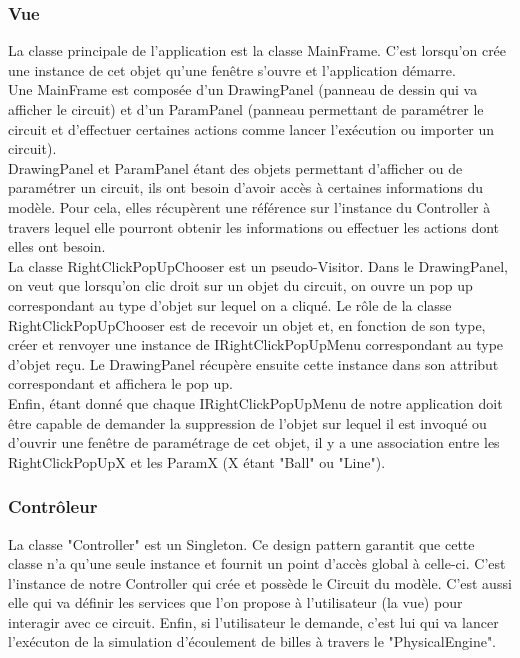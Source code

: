 \documentclass{report}
\begin{document}
\subsubsection{Vue}

La classe principale de l'application est la classe MainFrame. C'est lorsqu'on crée une instance de cet objet qu'une fenêtre s'ouvre et l'application démarre. \\

Une MainFrame est composée d'un DrawingPanel (panneau de dessin qui va afficher le circuit) et d'un ParamPanel (panneau permettant de paramétrer le circuit et d'effectuer certaines actions comme lancer l'exécution ou importer un circuit). \\

DrawingPanel et ParamPanel étant des objets permettant d'afficher ou de paramétrer un circuit, ils ont besoin d'avoir accès à certaines informations du modèle. Pour cela, elles récupèrent une référence sur l'instance du Controller à travers lequel elle pourront obtenir les informations ou effectuer les actions dont elles ont besoin. \\

La classe RightClickPopUpChooser est un pseudo-Visitor. Dans le DrawingPanel, on veut que lorsqu'on clic droit sur un objet du circuit, on ouvre un pop up correspondant au type d'objet sur lequel on a cliqué. Le rôle de la classe RightClickPopUpChooser est de recevoir un objet et, en fonction de son type, créer et renvoyer une instance de  IRightClickPopUpMenu correspondant au type d'objet reçu. Le DrawingPanel récupère ensuite cette instance dans son attribut correspondant et affichera le pop up. \\

Enfin, étant donné que chaque IRightClickPopUpMenu de notre application doit être capable de demander la suppression de l'objet sur lequel il est invoqué ou d'ouvrir une fenêtre de paramétrage de cet objet, il y a une association entre les RightClickPopUpX et les ParamX (X étant "Ball" ou "Line").

\subsubsection{Contrôleur}

La classe "Controller" est un Singleton. Ce design pattern garantit que cette classe n'a qu'une seule instance et fournit un point d'accès global à celle-ci. C'est l'instance de notre Controller qui crée et possède le Circuit du modèle. C'est aussi elle qui va définir les services que l'on propose à l'utilisateur (la vue) pour interagir avec ce circuit. Enfin, si l'utilisateur le demande, c'est lui qui va lancer l'exécuton de la simulation d'écoulement de billes à travers le "PhysicalEngine".
\end{document}
